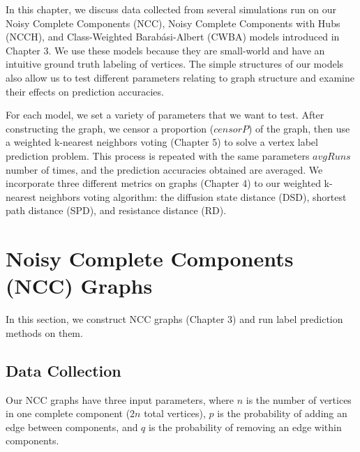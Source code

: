In this chapter, we discuss data collected from several simulations run on
our Noisy Complete Components (NCC), Noisy Complete Components with Hubs
(NCCH), and Class-Weighted Barab\'{a}si-Albert (CWBA) models introduced in
Chapter 3. We use these models because they are small-world and have an
intuitive ground truth labeling of vertices. The simple structures of our
models also allow us to test different parameters relating to graph 
structure and examine their effects on prediction accuracies.

For each model, we set a variety of parameters that we want to test.
After constructing the graph, we censor a proportion ($censorP$) of the 
graph, then use a weighted k-nearest neighbors voting (Chapter 5) to solve
a vertex label prediction problem. This process is repeated with the same
parameters $avgRuns$ number of times, and the prediction accuracies
obtained are averaged. We incorporate three different metrics on graphs
(Chapter 4) to our weighted k-nearest neighbors voting algorithm: 
the diffusion state distance (DSD), shortest path distance (SPD), and
resistance distance (RD).


\section{Noisy Complete Components (NCC) Graphs}
In this section, we construct NCC graphs (Chapter 3) and run label 
prediction methods on them.

\subsection{Data Collection}
Our NCC graphs have three input parameters, where $n$ is the number of
vertices in one complete component ($2n$ total vertices), $p$ is the
probability of adding an edge between components, and $q$ is the 
probability of removing an edge within components.

